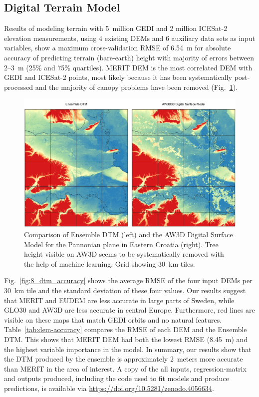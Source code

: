 \subsection*{Digital Terrain Model}

Results of modeling terrain with 5~million GEDI and 2 million ICESat-2 elevation measurements, using 4 existing DEMs and 6 auxiliary data sets as input variables, show a maximum cross-validation RMSE of 6.54~m for absolute accuracy of predicting terrain (bare-earth) height with majority of errors between 2--3~m (25\% and 75\% quartiles). MERIT DEM \citep{yamazaki2019merit} is the most correlated DEM with GEDI and ICESat-2 points, most likely because it has been systematically post-processed and the majority of canopy problems have been removed (Fig.\@~\ref{fig:7_dtm_comparison}). 

\begin{figure}[hbt]
\centering
\includegraphics[width=\linewidth]{figs_02/fig_7_dtm_comparison.png}
\caption{Comparison of Ensemble DTM (left) and the AW3D Digital Surface Model for the Pannonian plane in Eastern Croatia (right). Tree height visible on AW3D seems to be systematically removed with the help of machine learning. Grid showing 30~km tiles.}
\label{fig:7_dtm_comparison}
\end{figure}

Fig.\@~\ref{fig:8_dtm_accuracy} shows the average RMSE of the four input DEMs per 30\@~km tile and the standard deviation of these four values. Our results suggest that MERIT and EUDEM are  less accurate in large parts of Sweden, while GLO30 and AW3D are less accurate in central Europe. Furthermore, red lines are visible on these maps that match GEDI orbits and no natural features. Table~\ref{tab:dem-accuracy} compares the RMSE of each DEM and the Ensemble DTM. This shows that MERIT DEM had both the lowest RMSE (8.45~m) and the highest variable importance in the model. In summary, our results show that the DTM produced by the ensemble is approximately 2~meters more accurate than MERIT in the area of interest. A copy of the all inputs, regression-matrix and outputs produced, including the code used to fit models and produce predictions, is available via \url{https://doi.org/10.5281/zenodo.4056634}.

